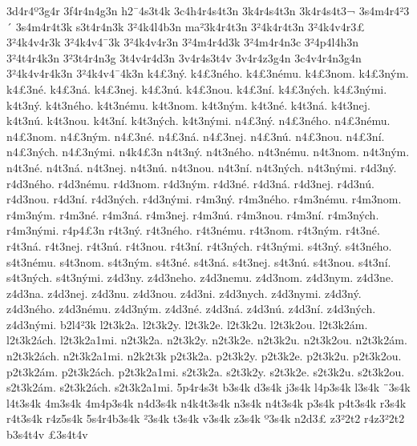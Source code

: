 {3d4r4^^ba3g4r
3f4r4n4g3n
h2^^af4s3t4k
3c4h4r4s4t3n
3k4r4s4t3n
3k4r4s4t3^^ac
3s4m4r4^^b23^^b4
3s4m4r4t3k
s3t4r4n3k
3^^b24k4l4b3n
ma^^b23k4r4t3n
3^^b24k4r4t3n
3^^b24k4v4r3^^a3
3^^b24k4v4r3k
3^^b24k4v4^^af3k
3^^b24k4v4r3n
3^^b24m4r4d3k
3^^b24m4r4n3c
3^^b24p4l4h3n
3^^b24t4r4k3n
3^^b23t4r4n3g
3t4v4r4d3n
3v4r4s3t4v
3v4r4z3g4n
3c4v4r4n3g4n
3^^b24k4v4r4k3n
3^^b24k4v4^^af4k3n
k4^^a33n^^fd.
k4^^a33n^^e9ho.
k4^^a33n^^e9mu.
k4^^a33nom.
k4^^a33n^^fdm.
k4^^a33n^^e9.
k4^^a33n^^e1.
k4^^a33nej.
k4^^a33n^^fa.
k4^^a33nou.
k4^^a33n^^ed.
k4^^a33n^^fdch.
k4^^a33n^^fdmi.
k4t3n^^fd.
k4t3n^^e9ho.
k4t3n^^e9mu.
k4t3nom.
k4t3n^^fdm.
k4t3n^^e9.
k4t3n^^e1.
k4t3nej.
k4t3n^^fa.
k4t3nou.
k4t3n^^ed.
k4t3n^^fdch.
k4t3n^^fdmi.
n4^^a33n^^fd.
n4^^a33n^^e9ho.
n4^^a33n^^e9mu.
n4^^a33nom.
n4^^a33n^^fdm.
n4^^a33n^^e9.
n4^^a33n^^e1.
n4^^a33nej.
n4^^a33n^^fa.
n4^^a33nou.
n4^^a33n^^ed.
n4^^a33n^^fdch.
n4^^a33n^^fdmi.
n4k4^^a33n
n4t3n^^fd.
n4t3n^^e9ho.
n4t3n^^e9mu.
n4t3nom.
n4t3n^^fdm.
n4t3n^^e9.
n4t3n^^e1.
n4t3nej.
n4t3n^^fa.
n4t3nou.
n4t3n^^ed.
n4t3n^^fdch.
n4t3n^^fdmi.
r4d3n^^fd.
r4d3n^^e9ho.
r4d3n^^e9mu.
r4d3nom.
r4d3n^^fdm.
r4d3n^^e9.
r4d3n^^e1.
r4d3nej.
r4d3n^^fa.
r4d3nou.
r4d3n^^ed.
r4d3n^^fdch.
r4d3n^^fdmi.
r4m3n^^fd.
r4m3n^^e9ho.
r4m3n^^e9mu.
r4m3nom.
r4m3n^^fdm.
r4m3n^^e9.
r4m3n^^e1.
r4m3nej.
r4m3n^^fa.
r4m3nou.
r4m3n^^ed.
r4m3n^^fdch.
r4m3n^^fdmi.
r4p4^^a33n
r4t3n^^fd.
r4t3n^^e9ho.
r4t3n^^e9mu.
r4t3nom.
r4t3n^^fdm.
r4t3n^^e9.
r4t3n^^e1.
r4t3nej.
r4t3n^^fa.
r4t3nou.
r4t3n^^ed.
r4t3n^^fdch.
r4t3n^^fdmi.
s4t3n^^fd.
s4t3n^^e9ho.
s4t3n^^e9mu.
s4t3nom.
s4t3n^^fdm.
s4t3n^^e9.
s4t3n^^e1.
s4t3nej.
s4t3n^^fa.
s4t3nou.
s4t3n^^ed.
s4t3n^^fdch.
s4t3n^^fdmi.
z4d3ny.
z4d3neho.
z4d3nemu.
z4d3nom.
z4d3nym.
z4d3ne.
z4d3na.
z4d3nej.
z4d3nu.
z4d3nou.
z4d3ni.
z4d3nych.
z4d3nymi.
z4d3n^^fd.
z4d3n^^e9ho.
z4d3n^^e9mu.
z4d3n^^fdm.
z4d3n^^e9.
z4d3n^^e1.
z4d3n^^fa.
z4d3n^^ed.
z4d3n^^fdch.
z4d3n^^fdmi.
b2l4^^b23k
l2t3k2a.
l2t3k2y.
l2t3k2e.
l2t3k2u.
l2t3k2ou.
l2t3k2^^e1m.
l2t3k2^^e1ch.
l2t3k2a1mi.
n2t3k2a.
n2t3k2y.
n2t3k2e.
n2t3k2u.
n2t3k2ou.
n2t3k2^^e1m.
n2t3k2^^e1ch.
n2t3k2a1mi.
n2k2t3k
p2t3k2a.
p2t3k2y.
p2t3k2e.
p2t3k2u.
p2t3k2ou.
p2t3k2^^e1m.
p2t3k2^^e1ch.
p2t3k2a1mi.
s2t3k2a.
s2t3k2y.
s2t3k2e.
s2t3k2u.
s2t3k2ou.
s2t3k2^^e1m.
s2t3k2^^e1ch.
s2t3k2a1mi.
5p4r4s3t
b3s4k
d3s4k
j3s4k
l4p3s4k
l3s4k
^^a83s4k
l4t3s4k
4m3s4k
4m4p3s4k
n4d3s4k
n4k4t3s4k
n3s4k
n4t3s4k
p3s4k
p4t3s4k
r3s4k
r4t3s4k
r4z5s4k
5s4r4b3s4k
^^b23s4k
t3s4k
v3s4k
z3s4k
^^ba3s4k
n2d3^^a3
z3^^b22t2
r4z3^^b22t2
b3s4t4v
^^a33s4t4v
}
